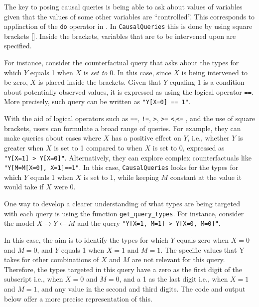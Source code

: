 \documentclass[
  11pt,
  article]{jss}
\begin{document}
The key to posing causal queries is being able to ask about values of
variables given that the values of some other variables are
``controlled''. This corresponds to appliaction of the \texttt{do}
operator in \citet{pearl2009causality}. In \texttt{CausalQueries} this
is done by using square brackets {[}{]}. Inside the brackets, variables
that are to be intervened upon are specified.

For instance, consider the counterfactual query that asks about the
types for which \(Y\) equals 1 when \(X\) is \emph{set to} 0. In this
case, since \(X\) is being intervened to be zero, \(X\) is placed inside
the brackets. Given that \(Y\) equaling 1 is a condition about
potentially observed values, it is expressed as using the logical
operator \texttt{==}. More precisely, such query can be written as
\texttt{"Y{[}X=0{]}\ ==\ 1"}.

With the aid of logical operators such as \texttt{==}, \texttt{!=},
\texttt{\textgreater{}}, \texttt{\textgreater{}=}
\texttt{\textless{}},\texttt{\textless{}=} , and the use of square
brackets, users can formulate a broad range of queries. For example,
they can make queries about cases where \(X\) has a positive effect on
\(Y\), i.e., whether \(Y\) is greater when \(X\) is set to 1 compared to
when \(X\) is set to 0, expressed as
\texttt{"Y{[}X=1{]}\ \textgreater{}\ Y{[}X=0{]}"}. Alternatively, they
can explore complex counterfactuals like
\texttt{"Y{[}M=M{[}X=0{]},\ X=1{]}==1"}. In this case,
\texttt{CausalQueries} looks for the types for which \(Y\) equals 1 when
\(X\) is set to 1, while keeping \(M\) constant at the value it would
take if \(X\) were 0.

One way to develop a clearer understanding of what types are being
targeted with each query is using the function
\texttt{get\_query\_types}. For instance, consider the model
\(X \rightarrow Y \leftarrow M\) and the query
\texttt{"Y{[}X=1,\ M=1{]}\ \textgreater{}\ Y{[}X=0,\ M=0{]}"}.

In this case, the aim is to identify the types for which \(Y\) equals
zero when \(X = 0\) and \(M = 0\), and \(Y\) equals 1 when \(X = 1\) and
\(M = 1\). The specific values that Y takes for other combinations of
\(X\) and \(M\) are not relevant for this query. Therefore, the types
targeted in this query have a zero as the first digit of the subscript
i.e., when \(X = 0\) and \(M = 0\), and a 1 as the last digit i.e., when
\(X = 1\) and \(M = 1\), and any value in the second and third digits.
The code and output below offer a more precise representation of this.
\end{document}
